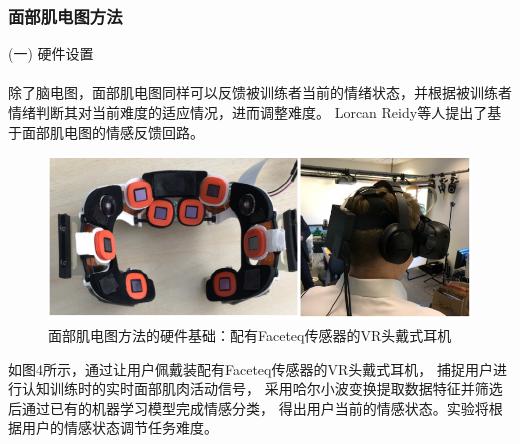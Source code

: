 \documentclass[12pt]{article}
\begin{document}
            \subsubsection{面部肌电图方法}
            (一) 硬件设置\paragraph{}
            除了脑电图，面部肌电图同样可以反馈被训练者当前的情绪状态，并根据被训练者情绪判断其对当前难度的适应情况，进而调整难度。
            Lorcan Reidy\cite{ref10}等人提出了基于面部肌电图的情感反馈回路。
            \begin{figure}[H]
            	
            	\centering
            	\includegraphics[scale=0.8]{images/Faceteq.png}
            	\caption{面部肌电图方法的硬件基础：配有Faceteq传感器的VR头戴式耳机}
            	\label{fig:label}
            \end{figure}
            如图4所示，通过让用户佩戴装配有Faceteq传感器的VR头戴式耳机，
            捕捉用户进行认知训练时的实时面部肌肉活动信号，
            采用哈尔小波变换提取数据特征并筛选后通过已有的机器学习模型完成情感分类，
            得出用户当前的情感状态。实验将根据用户的情感状态调节任务难度。
\end{document}
